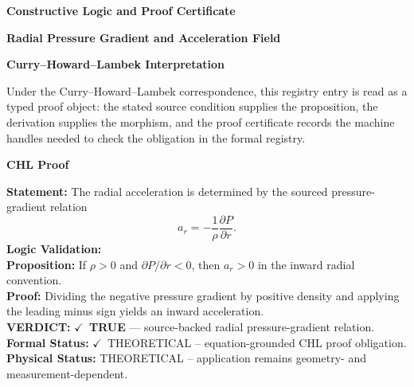 \endgroup

\ifTZPDarkEdition
{}
\fi

\clearpage
\begingroup\tzpsupportsetup
\noindent\textbf{\fontsize{10.8pt}{12.8pt}\selectfont [ID 0123] Constructive Logic and Proof Certificate}\par
\noindent\textbf{\fontsize{10pt}{12pt}\selectfont Radial Pressure Gradient and Acceleration Field}\par
\vspace{0.45em}
\begingroup
\footnotesize
\setlength{\parskip}{0.22em}
\setlength{\parindent}{0pt}
\noindent\textbf{Curry--Howard--Lambek Interpretation}\par
Under the Curry--Howard--Lambek correspondence, this registry entry is read as a typed proof
object: the stated source condition supplies the proposition, the derivation supplies the
morphism, and the proof certificate records the machine handles needed to check the obligation
in the formal registry.

\vspace{0.45em}
\noindent\textbf{CHL Proof}\par
\textbf{Statement:} The radial acceleration is determined by the sourced pressure-gradient relation
\[
a_r=-\frac{1}{\rho}\frac{\partial P}{\partial r}.
\]
\textbf{Logic Validation:}\\
\textbf{Proposition:} If \(\rho>0\) and \(\partial P/\partial r<0\), then \(a_r>0\) in the inward radial convention.\\
\textbf{Proof:} Dividing the negative pressure gradient by positive density and applying the leading minus sign yields an inward acceleration.\\
\textbf{VERDICT:} \ensuremath{\checkmark}\ \textbf{TRUE} --- source-backed radial pressure-gradient relation.\\
\textbf{Formal Status:} \ensuremath{\checkmark}\ THEORETICAL -- equation-grounded CHL proof obligation.\\
\textbf{Physical Status:} THEORETICAL -- application remains geometry- and measurement-dependent.
\par\vspace{0.45em}
\par
\ifTZPDarkEdition
{}
\fi
\endgroup
\endgroup
